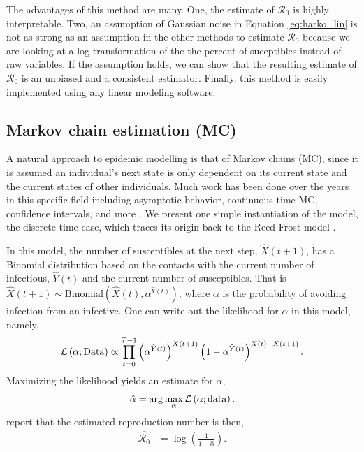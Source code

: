 \documentclass[12pt]{article}
\newcommand{\rr}{\ensuremath{\mathcal{R}_0}}
\begin{document}
The advantages of this method are many.  One, the estimate of $\rr$ is highly interpretable.  Two, an assumption of Gaussian noise in Equation \ref{eq:harko_lin} is not as strong as an assumption in the other methods to estimate $\rr$ because we are looking at a log transformation of the the percent of suceptibles instead of raw variables.  If the assumption holds, we can show that the resulting estimate of $\rr$ is an unbiased and a consistent estimator.  Finally,  this method is easily implemented using any linear modeling software.  

\subsection{Markov chain estimation (MC)}
A natural approach to epidemic modelling is that of Markov chains (MC), since it is assumed an individual's next state is only dependent on its current state and the current states of other individuals.  Much work has been done over the years in this specific field including asymptotic behavior, continuous time MC, confidence intervals, and more \citep{jacquez1991,gani1995,daley2001epidemic}.  We present one simple instantiation of the model, the discrete time case, which traces its origin back to the Reed-Frost model \citep{abbey1952}.

In this model, the number of susceptibles at the next step, $\hat{X}(t+1)$, has a Binomial distribution based on the contacts with the current number of infectious, $\hat{Y}(t)$ and the current number of susceptibles.  That is $\hat{X}(t+1) \sim \text{Binomial}\left(\hat{X}(t), \alpha^{\hat{Y}(t)}\right)$, where $\alpha$ is the probability of avoiding infection from an infective.  One can write out the likelihood for $\alpha$ in this model, namely,
\begin{align*}
\mathcal{L}\left ( \alpha ; \textnormal{Data}\right ) \propto \prod_{t=0}^{T-1}\left ( \alpha^{\hat{Y}(t)} \right )^{\hat{X}(t+1)} \left (1- \alpha^{\hat{Y}(t)} \right )^{\hat{X}(t) - \hat{X}(t+1)}.
\end{align*}
Maximizing the likelihood yields an estimate for $\alpha$,
\begin{align*}
\hat{\alpha} = \arg \max_{\alpha} \mathcal{L}\left(\alpha; \textnormal{data} \right ).
  \end{align*}
 \cite{barbour2004} report that the estimated reproduction number is then,
\begin{align}\label{eq:r0-mc}
\hat{\rr} &= \log \left ( \frac{1}{1-\hat{\alpha}}\right ).
\end{align}
\end{document}
